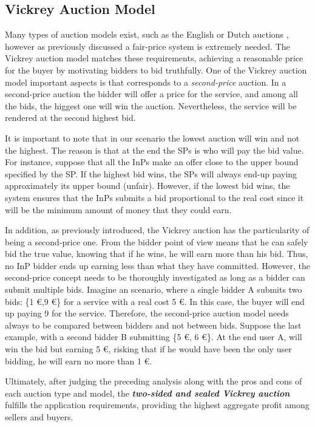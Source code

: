 \subsection{Vickrey Auction Model}

Many types of auction models exist, such as the English or Dutch auctions \cite{coppinger1980incentives}, however as previously discussed a fair-price system is extremely needed. The Vickrey auction model \cite{vickrey1961counterspeculation} matches these requirements, achieving a reasonable price for the buyer by motivating bidders to bid truthfully. One of the Vickrey auction model important aspects is that corresponds to a \textit{second-price} auction. In a second-price auction the bidder will offer a price for the service, and among all the bids, the higgest one will win the auction. Nevertheless, the service will be rendered at the second highest bid. 

It is important to note that in our scenario the lowest auction will win and not the highest. The reason is that at the end the SPs is who will pay the bid value. For instance, suppose that all the InPs make an offer close to the upper bound specified by the SP. If the highest bid wins, the SPs will always end-up paying approximately its upper bound (unfair). However, if the lowest bid wins, the system ensures that the InPs submits a bid proportional to the real cost since it will be the minimum amount of money that they could earn.

In addition, as previously introduced, the Vickrey auction has the particularity of being a second-price one. From the bidder point of view means that he can safely bid the true value, knowing that if he wins, he will earn more than his bid. Thus, no InP bidder ends up earning less than what they have committed. However, the second-price concept needs to be thoroughly investigated as long as a bidder can submit multiple bids. Imagine an scenario, where a single bidder A submits two bids: \{1 \euro,9 \euro\} for a service with a real cost 5 \euro. In this case, the buyer will end up paying 9 for the service. Therefore, the second-price auction model needs always to be compared between bidders and not between bids. Suppose the last example, with a second bidder B submitting \{5 \euro, 6 \euro\}. At the end user A, will win the bid but earning 5 \euro, risking that if he would have been the only user bidding, he will earn no more than 1 \euro.

Ultimately, after judging the preceding analysis along with the pros and cons of each auction type and model, the \textbf{\textit{two-sided and sealed Vickrey auction}} fulfills the application requirements, providing the highest aggregate profit among sellers and buyers.

